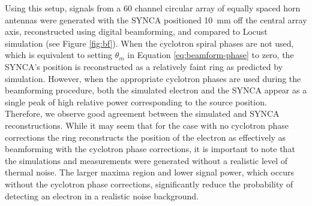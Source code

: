 Using this setup, signals from a 60 channel circular array of equally spaced horn antennas were generated with the SYNCA positioned 10~mm off the central array axis, reconstructed using digital beamforming, and compared to Locust simulation (see Figure \ref{fig:bf}). When the cyclotron spiral phases are not used, which is equivalent to setting $\theta_m$ in Equation \ref{eq:beamform-phase} to zero, the SYNCA's position is reconstructed as a relatively faint ring as predicted by simulation. However, when the appropriate cyclotron phases are used during the beamforming procedure, both the simulated electron and the SYNCA appear as a single peak of high relative power corresponding to the source position. Therefore, we observe good agreement between the simulated and SYNCA reconstructions. While it may seem that for the case with no cyclotron phase corrections the ring reconstructs the position of the electron as effectively as beamforming with the cyclotron phase corrections, it is important to note that the simulations and measurements were generated without a realistic level of thermal noise. The larger maxima region and lower signal power, which occurs without the cyclotron phase corrections, significantly reduce the probability of detecting an electron in a realistic noise background.
